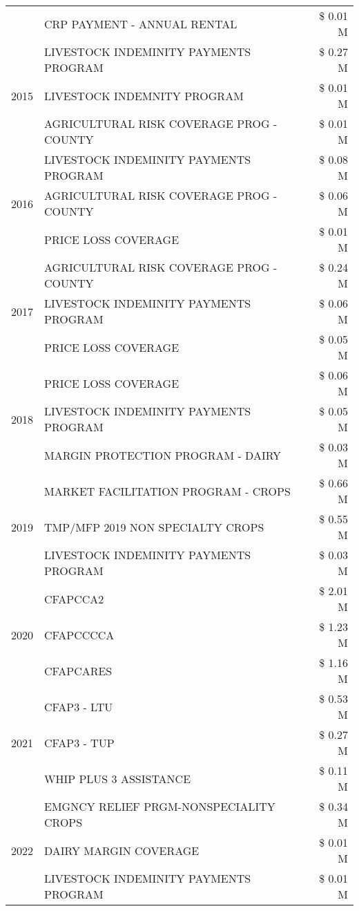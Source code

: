 \begin{tabular}{llr}
 & CRP PAYMENT - ANNUAL RENTAL & \$ 0.01 M \\
\cline{1-3}
\multirow[t]{3}{*}{2015} & LIVESTOCK INDEMINITY PAYMENTS PROGRAM & \$ 0.27 M \\
 & LIVESTOCK INDEMNITY PROGRAM & \$ 0.01 M \\
 & AGRICULTURAL RISK COVERAGE PROG - COUNTY & \$ 0.01 M \\
\cline{1-3}
\multirow[t]{3}{*}{2016} & LIVESTOCK INDEMINITY PAYMENTS PROGRAM & \$ 0.08 M \\
 & AGRICULTURAL RISK COVERAGE PROG - COUNTY & \$ 0.06 M \\
 & PRICE LOSS COVERAGE & \$ 0.01 M \\
\cline{1-3}
\multirow[t]{3}{*}{2017} & AGRICULTURAL RISK COVERAGE PROG - COUNTY & \$ 0.24 M \\
 & LIVESTOCK INDEMINITY PAYMENTS PROGRAM & \$ 0.06 M \\
 & PRICE LOSS COVERAGE & \$ 0.05 M \\
\cline{1-3}
\multirow[t]{3}{*}{2018} & PRICE LOSS COVERAGE & \$ 0.06 M \\
 & LIVESTOCK INDEMINITY PAYMENTS PROGRAM & \$ 0.05 M \\
 & MARGIN PROTECTION PROGRAM - DAIRY & \$ 0.03 M \\
\cline{1-3}
\multirow[t]{3}{*}{2019} & MARKET FACILITATION PROGRAM - CROPS & \$ 0.66 M \\
 & TMP/MFP 2019 NON SPECIALTY CROPS & \$ 0.55 M \\
 & LIVESTOCK INDEMINITY PAYMENTS PROGRAM & \$ 0.03 M \\
\cline{1-3}
\multirow[t]{3}{*}{2020} & CFAPCCA2 & \$ 2.01 M \\
 & CFAPCCCCA & \$ 1.23 M \\
 & CFAPCARES & \$ 1.16 M \\
\cline{1-3}
\multirow[t]{3}{*}{2021} & CFAP3 - LTU & \$ 0.53 M \\
 & CFAP3 - TUP & \$ 0.27 M \\
 & WHIP PLUS 3 ASSISTANCE & \$ 0.11 M \\
\cline{1-3}
\multirow[t]{3}{*}{2022} & EMGNCY RELIEF PRGM-NONSPECIALITY CROPS & \$ 0.34 M \\
 & DAIRY MARGIN COVERAGE & \$ 0.01 M \\
 & LIVESTOCK INDEMINITY PAYMENTS PROGRAM & \$ 0.01 M \\
\cline{1-3}
\bottomrule
\end{tabular}
